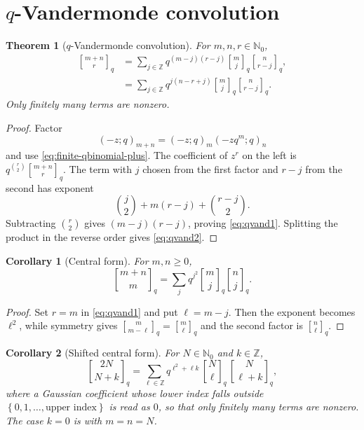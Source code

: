 \documentclass[11pt,oneside,openany]{book}
\newtheorem{theorem}{Theorem}[chapter]
\newtheorem{corollary}[corollary]{Corollary}
\theoremstyle{definition}
\theoremstyle{remark}
\newcommand{\qbinom}[2]{\genfrac{[}{]}{0pt}{}{#1}{#2}_{q}}
\newcommand{\Z}{\mathbb Z}
\newcommand{\N}{\mathbb N}
\newcommand{\set}[1]{\left\{#1\right\}}
\begin{document}
\section{\texorpdfstring{$q$}{q}-Vandermonde convolution}

\begin{theorem}[$q$-Vandermonde convolution]\label{thm:q-vandermonde}
For $m,n,r\in\N_0$,
\begin{align}
 \qbinom{m+n}{r}
 &=\sum_{j\in\Z}q^{(m-j)(r-j)}
 \qbinom mj\qbinom n{r-j},\label{eq:qvand1}\\
 &=\sum_{j\in\Z}q^{j(n-r+j)}
 \qbinom mj\qbinom n{r-j}.\label{eq:qvand2}
\end{align}
Only finitely many terms are nonzero.
\end{theorem}

\begin{proof}
Factor
\[
 (-z;q)_{m+n}=(-z;q)_m(-zq^m;q)_n
\]
and use \eqref{eq:finite-qbinomial-plus}.  The coefficient of $z^r$ on the left is
\(
 q^{\binom r2}\qbinom{m+n}{r}.
\)
The term with $j$ chosen from the first factor and $r-j$ from the second has exponent
\[
 \binom j2+m(r-j)+\binom{r-j}{2}.
\]
Subtracting $\binom r2$ gives $(m-j)(r-j)$, proving \eqref{eq:qvand1}.  Splitting the product in the reverse order gives \eqref{eq:qvand2}.
\end{proof}

\begin{corollary}[Central form]\label{cor:central-vandermonde}
For $m,n\ge0$,
\[
 \qbinom{m+n}{m}
 =\sum_j q^{j^2}\qbinom mj\qbinom n j.
\]
\end{corollary}

\begin{proof}
Set $r=m$ in \eqref{eq:qvand1} and put $\ell=m-j$.  Then the exponent becomes $\ell^2$, while symmetry gives $\qbinom m{m-\ell}=\qbinom m\ell$ and the second factor is $\qbinom n\ell$.
\end{proof}


\begin{corollary}[Shifted central form]\label{cor:shifted-central-vandermonde}
For $N\in\N_0$ and $k\in\Z$,
\begin{equation}
 \qbinom{2N}{N+k}
 =\sum_{\ell\in\Z}q^{\ell^2+\ell k}\,
 \qbinom N\ell\,\qbinom N{\ell+k},
 \label{eq:shifted-central-vandermonde}
\end{equation}
where a Gaussian coefficient whose lower index falls outside $\set{0,1,\dots,\text{upper index}}$ is read as $0$, so that only finitely many terms are nonzero.  The case $k=0$ is  with $m=n=N$.
\end{corollary}
\end{document}
